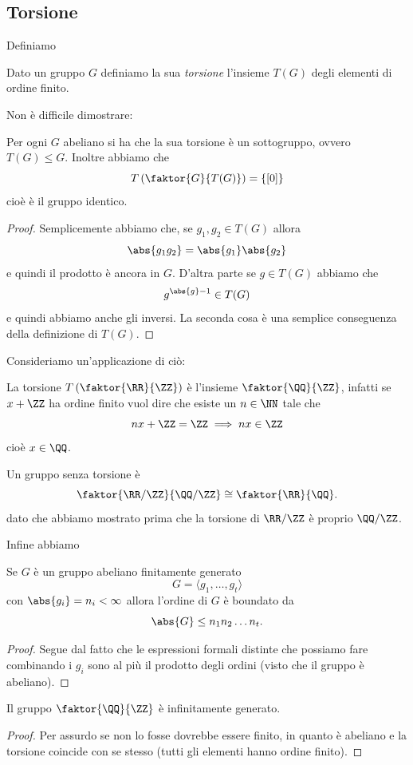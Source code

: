\documentclass[11pt]{scrartcl}
\begin{document}
	\subsection{Torsione}
	Definiamo
	\begin{definition}[Torsione]
		Dato un gruppo $G$ definiamo la sua \textit{torsione} l'insieme $T(G)$ degli elementi di ordine finito.
	\end{definition}
	Non è difficile dimostrare:
	\begin{proposition}
		Per ogni $G$ abeliano si ha che la sua torsione è un sottogruppo, ovvero $T(G)\le G$. Inoltre abbiamo che
		$$T\left(\faktor{G}{T(G)}\right)=\left\{[0]\right\}$$
		cioè è il gruppo identico.
	\end{proposition}
	\begin{proof}
		Semplicemente abbiamo che, se $g_1,g_2\in T(G)$ allora
		$$\abs{g_1g_2}=\abs{g_1}\abs{g_2}$$
		e quindi il prodotto è ancora in $G$. D'altra parte se $g\in T(G)$ abbiamo che 
		$$g^{\abs{g}-1}\in T(G)$$
		e quindi abbiamo anche gli inversi. La seconda cosa è una semplice conseguenza della definizione di $T(G)$. 
	\end{proof}
	Consideriamo un'applicazione di ciò:
	\begin{example}
		La torsione $T\left(\faktor{\RR}{\ZZ}\right)$ è l'insieme $\faktor{\QQ}{\ZZ}$, infatti se $x+\ZZ$ ha ordine finito vuol dire che esiste un $n\in\NN$ tale che 
		$$nx+\ZZ = \ZZ \implies nx\in \ZZ$$
		cioè $x\in\QQ$.   
	\end{example}
	\begin{example}
		Un gruppo senza torsione è
		$$\faktor{\RR/\ZZ}{\QQ/\ZZ}\cong \faktor{\RR}{\QQ}.$$
		dato che abbiamo mostrato prima che la torsione di $\RR/\ZZ$ è proprio $\QQ/\ZZ$.
	\end{example}
	Infine abbiamo
	\begin{proposition}
		Se $G$ è un gruppo abeliano finitamente generato 
		$$G=\langle g_1,\dots,g_t\rangle$$
		con $\abs{g_i}=n_i<\infty$ allora l'ordine di $G$ è boundato da
		$$\abs{G}\le n_1n_2\dots n_t.$$
	\end{proposition}
	\begin{proof}
		Segue dal fatto che le espressioni formali distinte che possiamo fare combinando i $g_i$ sono al più il prodotto degli ordini (visto che il gruppo è abeliano).
	\end{proof}
	\begin{corollary}
		Il gruppo $\faktor{\QQ}{\ZZ}$ è infinitamente generato.
	\end{corollary}
	\begin{proof}
		Per assurdo se non lo fosse dovrebbe essere finito, in quanto è abeliano e la torsione coincide con se stesso (tutti gli elementi hanno ordine finito).
	\end{proof}
	
\end{document}
